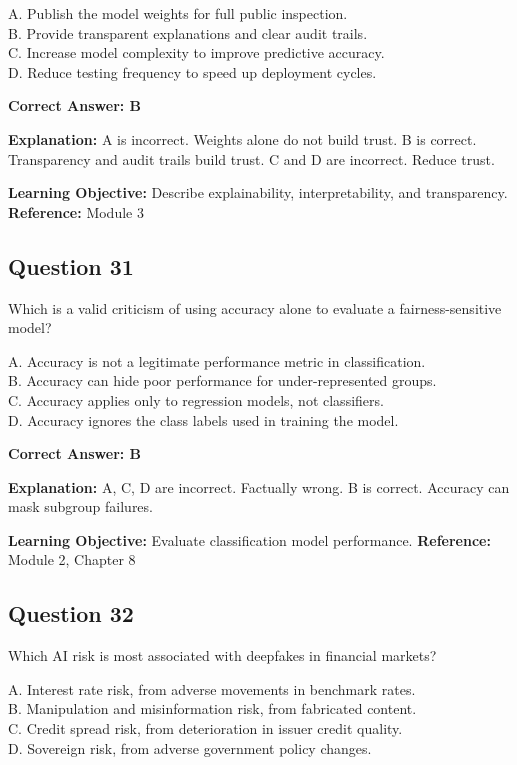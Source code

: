 \documentclass[11pt]{article}
\begin{document}
	A. Publish the model weights for full public inspection.\\
	B. Provide transparent explanations and clear audit trails.\\
	C. Increase model complexity to improve predictive accuracy.\\
	D. Reduce testing frequency to speed up deployment cycles.
	
	\vspace{0.4em}
	\textbf{Correct Answer: B}
	
	\textbf{Explanation:}
	A is incorrect. Weights alone do not build trust.
	B is correct. Transparency and audit trails build trust.
	C and D are incorrect. Reduce trust.
	
	\textbf{Learning Objective:} Describe explainability, interpretability,
	and transparency.
	\textbf{Reference:} Module 3
	
	\subsection*{Question 31}
	Which is a valid criticism of using accuracy alone to evaluate a
	fairness-sensitive model?
	
	A. Accuracy is not a legitimate performance metric in classification.\\
	B. Accuracy can hide poor performance for under-represented groups.\\
	C. Accuracy applies only to regression models, not classifiers.\\
	D. Accuracy ignores the class labels used in training the model.
	
	\vspace{0.4em}
	\textbf{Correct Answer: B}
	
	\textbf{Explanation:}
	A, C, D are incorrect. Factually wrong.
	B is correct. Accuracy can mask subgroup failures.
	
	\textbf{Learning Objective:} Evaluate classification model performance.
	\textbf{Reference:} Module 2, Chapter 8
	
	\subsection*{Question 32}
	Which AI risk is most associated with deepfakes in financial markets?
	
	A. Interest rate risk, from adverse movements in benchmark rates.\\
	B. Manipulation and misinformation risk, from fabricated content.\\
	C. Credit spread risk, from deterioration in issuer credit quality.\\
	D. Sovereign risk, from adverse government policy changes.
	
\end{document}
